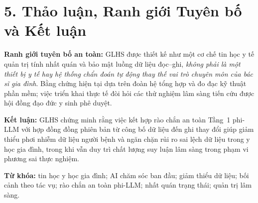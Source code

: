 \documentclass[11pt]{article}
\begin{document}
\section*{5. Thảo luận, Ranh giới Tuyên bố và Kết luận}
\textbf{Ranh giới tuyên bố an toàn:} GLHS được thiết kế như một cơ chế tin học y tế quản trị tính nhất quán và bảo mật luồng dữ liệu đọc--ghi, \emph{không phải là một thiết bị y tế hay hệ thống chẩn đoán tự động thay thế vai trò chuyên môn của bác sĩ gia đình}. Bằng chứng hiện tại dựa trên đoàn hệ tổng hợp và đo đạc kỹ thuật phần mềm; việc triển khai thực tế đòi hỏi các thử nghiệm lâm sàng tiến cứu được hội đồng đạo đức y sinh phê duyệt.

\textbf{Kết luận:} GLHS chứng minh rằng việc kết hợp rào chắn an toàn Tầng~1 phi-LLM với hợp đồng đồng phiên bản từ công bố dữ liệu đến ghi thay đổi giúp giảm thiểu phơi nhiễm dữ liệu người bệnh và ngăn chặn rủi ro sai lệch dữ liệu trong y học gia đình, trong khi vẫn duy trì chất lượng suy luận lâm sàng trong phạm vi phương sai thực nghiệm.

\textbf{Từ khóa:} tin học y học gia đình; AI chăm sóc ban đầu; giảm thiểu dữ liệu; bối cảnh theo tác vụ; rào chắn an toàn phi-LLM; nhất quán trạng thái; quản trị lâm sàng.
\end{document}
